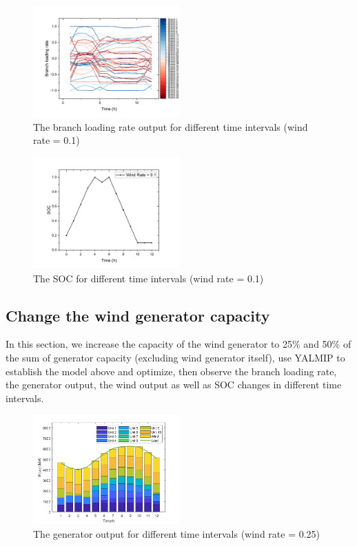 \documentclass[lettersize,journal]{IEEEtran}
\begin{document}
\begin{figure}[htbp]
	\centering
	\includegraphics[width=0.5\textwidth]{t3-br-wr0.1}
	\caption{The branch loading rate output for different time intervals (wind rate = 0.1)}
	\label{fig_2}
\end{figure}

\begin{figure}[htbp]
	\centering
	\includegraphics[width=0.5\textwidth]{t3-SOC-wr0.1}
	\caption{The SOC for different time intervals (wind rate = 0.1)}
	\label{fig_2}
\end{figure}

\subsection{Change the wind generator capacity}
In this section, we increase the capacity of the wind generator to 25\% and 50\% of the sum of generator capacity (excluding wind generator itself), use YALMIP to establish the model above and optimize, then observe the branch loading rate, the generator output, the wind output as well as SOC changes in different time intervals.

\begin{figure}[htbp]
	\centering
	\includegraphics[width=0.5\textwidth]{t3-wr0.25}
	\caption{The generator output for different time intervals (wind rate = 0.25)}
	\label{fig_2}
\end{figure}
\end{document}

